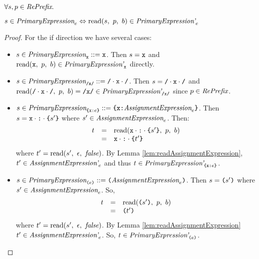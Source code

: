 \documentclass[preprint,10pt]{sigplanconf}
\begin{document}
\begin{lemma}\mbox{}
  
  \( \forall s, p \in \textit{RePrefix}. \)

  \( s \in \textit{PrimaryExpression}_{e} \Leftrightarrow 
  \textrm{read}(s,~p,~b) \in \textit{PrimaryExpression'}_{e} \)
\end{lemma}
\begin{proof}
  For the if direction we have several cases:
  \begin{itemize}
  \item \( s \in \textit{PrimaryExpression}_{\texttt{x}} ::= \texttt{x} \). Then \( s
    = \texttt{x} \) and \( \textrm{read}(\texttt{x},~p,~b) \in
    \textit{PrimaryExpression'}_{\texttt{x}} \) directly.

  \item \( s \in \textit{PrimaryExpression}_{\texttt{/x/}} ::= \texttt{/} \cdot \texttt{x} \cdot \texttt{/} \). Then \( s
    = \texttt{/} \cdot \texttt{x} \cdot \texttt{/} \) and \( \textrm{read}(\texttt{/} \cdot \texttt{x} \cdot \texttt{/},~p,~b) = \texttt{/x/} \in
    \textit{PrimaryExpression'}_{\texttt{/x/}} \) since \( p \in \textit{RePrefix} \).

  \item \( s \in \textit{PrimaryExpression}_{\texttt{\{}\texttt{x}\texttt{:}e\texttt{\}}}
    ::= \texttt{\{}\texttt{x}\texttt{:} \textit{AssignmentExpression}_{e}\texttt{\}} \).
    Then \( s = \texttt{x} \cdot \texttt{:} \cdot \texttt{\{}s'\texttt{\}} \) where \(
    s' \in \textit{AssignmentExpression}_{e} \). Then:
    \[
    \begin{array}{rcl}
      t &=& \textrm{read}(\texttt{x}\cdot  \texttt{:} \cdot \texttt{\{}s'\texttt{\}},~p,~b)
      \\
      &=& \texttt{x} \cdot \texttt{:} \cdot \texttt{\{}t'\texttt{\}}
    \end{array}
    \]
    where \( t' = \textrm{read}(s',~\epsilon,~\textit{false}) \). By Lemma
    \ref{lem:readAssignmentExpression}, \( t' \in
    \textit{AssignmentExpression'}_{e} \) and thus \( t \in
    \textit{PrimaryExpression'}_{\texttt{\{}\texttt{x}\texttt{:}e\texttt{\}}} \).
    
  \item \( s \in \textit{PrimaryExpression}_{\texttt{(}e\texttt{)}}
    ::= \texttt{(}\textit{AssignmentExpression}_{e}\texttt{)} \). Then \( s = \texttt{(}s'\texttt{)} \)
    where \( s' \in \textit{AssignmentExpression}_{e} \). So,
    \[
    \begin{array}{rcl}
      t &=& \textrm{read}(\texttt{(}s'\texttt{)},~p,~b)
      \\
      &=& \texttt{(}t'\texttt{)}
    \end{array}
    \]
    where \( t' = \textrm{read}(s',~\epsilon,~\textit{false}) \). By Lemma
    \ref{lem:readAssignmentExpression} \( t' \in
    \textit{AssignmentExpression'}_{e} \). So, \( t \in
    \textit{PrimaryExpression'}_{\texttt{(}e\texttt{)}} \).
  \end{itemize}
\end{proof}
\end{document}
